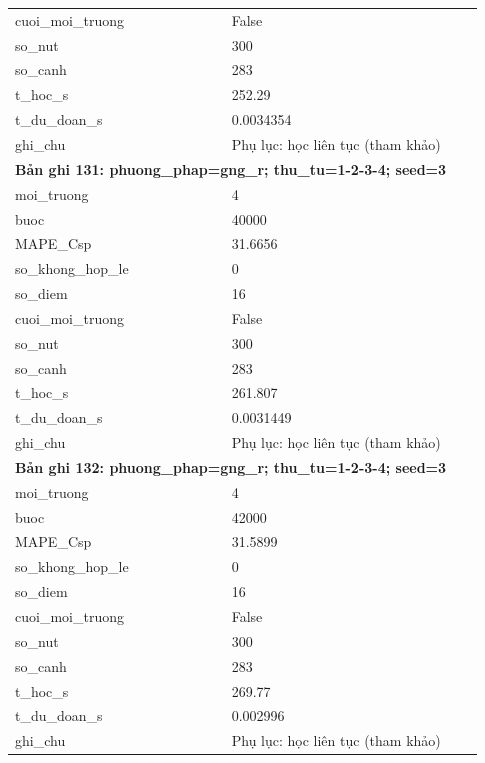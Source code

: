 \begin{longtable}{p{0.43\linewidth}p{0.50\linewidth}}
cuoi\_\allowbreak moi\_\allowbreak truong & False \\
so\_\allowbreak nut & 300 \\
so\_\allowbreak canh & 283 \\
t\_\allowbreak hoc\_\allowbreak s & 252.29 \\
t\_\allowbreak du\_\allowbreak doan\_\allowbreak s & 0.0034354 \\
ghi\_\allowbreak chu & Phụ lục: học liên tục (tham khảo) \\
\midrule
\multicolumn{2}{p{0.95\linewidth}}{\textbf{Bản ghi 131: phuong\_phap=gng\_r; thu\_tu=1-2-3-4; seed=3}} \\
moi\_\allowbreak truong & 4 \\
buoc & 40000 \\
MAPE\_\allowbreak Csp & 31.6656 \\
so\_\allowbreak khong\_\allowbreak hop\_\allowbreak le & 0 \\
so\_\allowbreak diem & 16 \\
cuoi\_\allowbreak moi\_\allowbreak truong & False \\
so\_\allowbreak nut & 300 \\
so\_\allowbreak canh & 283 \\
t\_\allowbreak hoc\_\allowbreak s & 261.807 \\
t\_\allowbreak du\_\allowbreak doan\_\allowbreak s & 0.0031449 \\
ghi\_\allowbreak chu & Phụ lục: học liên tục (tham khảo) \\
\midrule
\multicolumn{2}{p{0.95\linewidth}}{\textbf{Bản ghi 132: phuong\_phap=gng\_r; thu\_tu=1-2-3-4; seed=3}} \\
moi\_\allowbreak truong & 4 \\
buoc & 42000 \\
MAPE\_\allowbreak Csp & 31.5899 \\
so\_\allowbreak khong\_\allowbreak hop\_\allowbreak le & 0 \\
so\_\allowbreak diem & 16 \\
cuoi\_\allowbreak moi\_\allowbreak truong & False \\
so\_\allowbreak nut & 300 \\
so\_\allowbreak canh & 283 \\
t\_\allowbreak hoc\_\allowbreak s & 269.77 \\
t\_\allowbreak du\_\allowbreak doan\_\allowbreak s & 0.002996 \\
ghi\_\allowbreak chu & Phụ lục: học liên tục (tham khảo) \\

\end{longtable}
